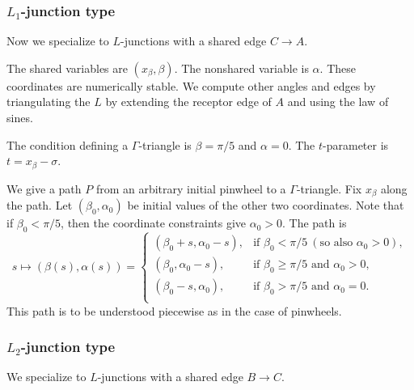 
\subsubsection{$L_1$-junction type}

Now we specialize to $L$-junctions with a shared edge $C\to A$.  

The shared variables are $(x_\beta,\beta)$.  The nonshared variable is $\alpha$.
These coordinates are numerically stable.  We compute other angles and edges by triangulating
the $L$ by extending the receptor edge of $A$ and using the law of sines.

The condition defining a $\Gamma$-triangle is $\beta=\pi/5$ and $\alpha=0$.   The $t$-parameter is $t =x_\beta - \sigma$.

We give a path $P$ from an arbitrary initial pinwheel 
to a $\Gamma$-triangle.  Fix $x_\beta$ along the path.  Let $(\beta_0,\alpha_0)$ be initial values of the other two coordinates.
Note that if $\beta_0<\pi/5$, then the coordinate constraints give $\alpha_0>0$.
The path is 
\[
s\mapsto (\beta(s),\alpha(s)) = 
\begin{cases}
(\beta_0+s,\alpha_0-s),&\text{if } \beta_0 < \pi/5 ~(\text{so also } \alpha_0>0),\\
(\beta_0,\alpha_0-s),&\text{if } \beta_0 \ge \pi/5 \text{ and } \alpha_0 > 0,\\
(\beta_0-s,\alpha_0),&\text{if } \beta_0 > \pi/5 \text{ and } \alpha_0 = 0.\\
\end{cases}
\]
This path is to be understood piecewise as in the case of pinwheels. 

\subsubsection{$L_2$-junction type}

We specialize to $L$-junctions with a shared edge $B\to C$.  

